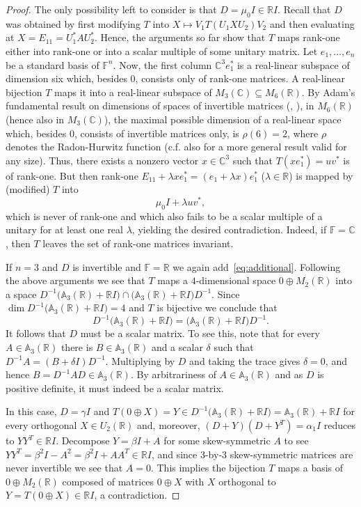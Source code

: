 \documentclass[11pt]{article}
\numberwithin{equation}{section}
\def\IF{{\mathbb F}}
\def\IC{{\mathbb C}}
\def\IR{{\mathbb R}}
\def\IA{{\mathbb A}}
\begin{document}
\begin{proof}
The only possibility left to consider is that $D=\mu_0 I\in\IR I$. Recall that $D$ was obtained by first modifying $T$ into $X\mapsto V_1T(U_1XU_2)V_2$ and then evaluating at $X=E_{11}=U_1^\ast A U_2^\ast$. Hence, the arguments so far show that $T$ maps rank-one either into rank-one or into a scalar multiple of some unitary matrix. Let $e_1,\dots,e_n$ be a standard basis of $\IF^n$.
Now, the first column $\IC^3 e_1^\ast$ is a real-linear subspace of dimension six which, besides $0$, consists only of rank-one matrices. A real-linear bijection $T$ maps it into a real-linear subspace of $M_3(\IC)\subseteq M_6(\IR)$. By Adam's fundamental result on dimensions of spaces of invertible matrices (\cite{Adams1962},  \cite{AdamsLaxPhillips1965}), in $M_6(\IR)$ (hence also in $M_3(\IC)$), the maximal possible dimension of a real-linear space which, besides $0$, consists of invertible matrices only, is $\rho(6)=2$, where $\rho$ denotes the Radon-Hurwitz function (c.f. also \cite{AdamsLaxPhillips1965} for a more general result valid for any size). Thus, there exists a nonzero vector $x\in\IC^3$ such that $T(xe_1^\ast)=uv^\ast$ is of rank-one. But then rank-one $E_{11}+\lambda xe_1^\ast=(e_1+\lambda x)e_1^\ast$ ($\lambda\in\IR$)  is mapped by (modified)  $T$ into
$$\mu_0 I + \lambda uv^\ast,$$
 which  is never of rank-one and which  also fails to be  a scalar multiple of a unitary  for  at least one real $\lambda$, yielding the desired contradiction. Indeed, if $\IF=\IC$, then $T$ leaves the set of rank-one matrices invariant.

If $n=3$ and $D$ is invertible and $\IF=\IR$
 we again  add~\eqref{eq:additional}.
Following the above arguments we see that $T$ maps a $4$-dimensional  space $0\oplus M_{2}(\IR)$ into a space
$D^{-1}\bigl(\IA_3(\IR)+\IR I\bigr)\cap \bigl(\IA_3(\IR)+\IR I\bigr)D^{-1}$. Since
$\dim D^{-1}\bigl(\IA_3(\IR)+\IR I\bigr)=4$ and $T$ is bijective we conclude that
$$D^{-1}\bigl(\IA_3(\IR)+\IR I\bigr)=\bigl(\IA_3(\IR)+\IR I\bigr)D^{-1}.$$
It follows that $D$ must be a scalar matrix. To see this, note that for every
$A\in \IA_3(\IR)$ there is $B\in\IA_3(\IR)$ and a scalar $\delta$ such that
$D^{-1}A=(B+\delta I)D^{-1}$. Multiplying by $D$ and
taking the trace gives $\delta=0$, and hence $B=D^{-1}AD\in \IA_3(\IR)$. By arbitrariness of $A\in \IA_3(\IR)$ and as $D$ is positive definite, it must indeed be a scalar matrix.

 In this case, $D=\gamma I$ and
 $T(0\oplus X)=Y\in D^{-1}\bigl(\IA_3(\IR)+\IR I\bigr) = \IA_3(\IR)+\IR I$ for every
 orthogonal $X\in U_{2}(\IR)$ and, moreover, $(D+ Y)(D+Y^T) =\alpha_1 I$ reduces to $YY^T\in\IR I$. Decompose
 $Y=\beta I +A$ for some skew-symmetric $A$ to see $YY^T=\beta^2 I -A^2=\beta^2 I +AA^T\in\IR I$, and since
 $3$-by-$3$ skew-symmetric matrices are never invertible we see that $A=0$.  This implies the bijection $T$ maps a
 basis of $0\oplus M_2(\IR)$ composed of matrices $0\oplus X$ with $X$
 orthogonal to $Y= T(0\oplus X)\in\IR I$, a
 contradiction.
\end{proof}
\end{document}
